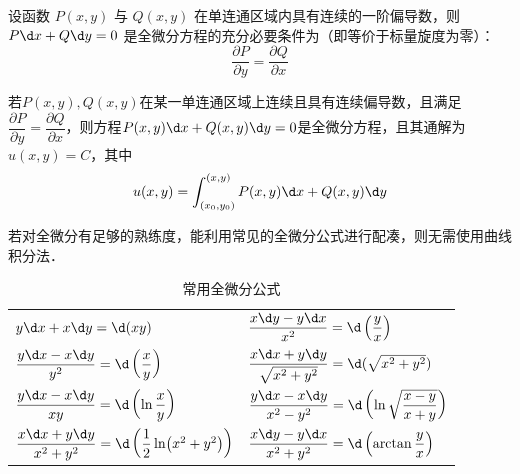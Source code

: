 \documentclass[12pt, a4paper, oneside, UTF8]{ctexbook}
\begin{document}
\begin{theorem}
    设函数 $P(x,y)$ 与 $Q(x,y)$ 在单连通区域内具有连续的一阶偏导数，则 $P\d x + Q\d y = 0$ 是全微分方程的充分必要条件为（即等价于标量旋度为零）：
    \[ \frac{\partial P}{\partial y} = \frac{\partial Q}{\partial x} \]
\end{theorem}

\begin{theorem}[曲线积分法求解全微分方程]
    若$P(x,y),Q(x,y)$在某一单连通区域上连续且具有连续偏导数，且满足$\dfrac{\partial P}{\partial y}=\dfrac{\partial Q}{\partial x}$，则方程$P(x,y)\d x+Q(x,y)\d y=0$是全微分方程，且其通解为$u(x,y)=C$，其中
    \[ u(x,y)= \int_{(x_0,y_0)}^{(x,y)} P(x,y)\d x + Q(x,y)\d y \]
\end{theorem}

若对全微分有足够的熟练度，能利用常见的全微分公式进行配凑，则无需使用曲线积分法．

\begin{table}[H]
    \centering
    \caption{常用全微分公式}
    \renewcommand\arraystretch{1.8}
    \begin{tabular}{ll}
        \hline
        $y \d x + x \d y=\d(xy)$ &
        $\dfrac{x \d y - y \d x}{x^2}=\d\left(\dfrac{y}{x}\right)$ \\
        $\dfrac{y \d x - x \d y}{y^2}=\d\left(\dfrac{x}{y}\right)$ &
        $\dfrac{x \d x + y \d y}{\sqrt{x^2+y^2}}=\d(\sqrt{x^2+y^2})$ \\
        $\dfrac{y \d x - x \d y}{xy}=\d\left(\ln\dfrac{x}{y}\right)$ &
        $\dfrac{y\d x-x\d y}{x^2-y^2}=\d\left(\ln\sqrt{\dfrac{x-y}{x+y}}\right)$ \\
        $\dfrac{x \d x + y \d y}{x^2+y^2}=\d\left(\dfrac{1}{2}\ln(x^2+y^2)\right)$ &
        $\dfrac{x \d y - y \d x}{x^2+y^2}=\d\left(\arctan\dfrac{y}{x}\right)$ \\
        \hline
    \end{tabular}
\end{table}
\end{document}
